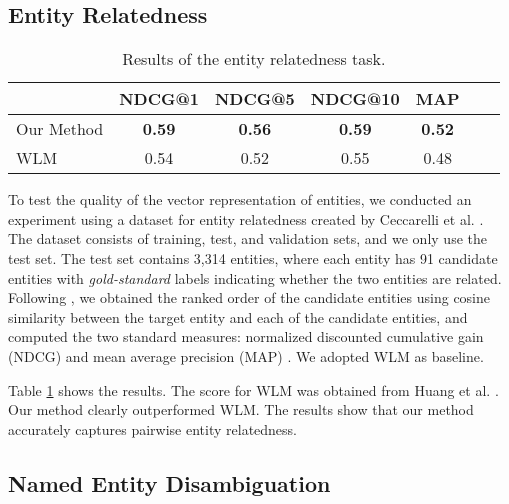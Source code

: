 \documentclass[11pt,letterpaper]{article}
\begin{document}
\subsection{Entity Relatedness}
\begin{table}[t]
\centering
\begin{tabular}{l|cccccc}
\hline
& \scriptsize{NDCG@1} & \scriptsize{NDCG@5} & \scriptsize{NDCG@10} & \scriptsize{MAP} \\
\hline
\footnotesize{Our Method} & \textbf{0.59} & \textbf{0.56} & \textbf{0.59} & \textbf{0.52} \\
\footnotesize{WLM} & 0.54 & 0.52 & 0.55 & 0.48 \\
\hline
\end{tabular}
\caption{Results of the entity relatedness task.}
\label{tb:entity-rel-scores}
\end{table}
To test the quality of the vector representation of entities, we conducted an experiment using a dataset for entity relatedness created by Ceccarelli et al. \cite{Ceccarelli2013}.
The dataset consists of training, test, and validation sets, and we only use the test set.
The test set contains 3,314 entities, where each entity has 91 candidate entities with \textit{gold-standard} labels indicating whether the two entities are related.
Following \cite{DBLP:journals/corr/HuangHJ15}, we obtained the ranked order of the candidate entities using cosine similarity between the target entity and each of the candidate entities, and computed the two standard measures: normalized discounted cumulative gain (NDCG) \cite{Jarvelin2002} and mean average precision (MAP) \cite{Manning2008}.
We adopted WLM as baseline.

Table \ref{tb:entity-rel-scores} shows the results.
The score for WLM was obtained from Huang et al. \cite{DBLP:journals/corr/HuangHJ15}.
Our method clearly outperformed WLM.
The results show that our method accurately captures pairwise entity relatedness.

\subsection{Named Entity Disambiguation}
\end{document}
